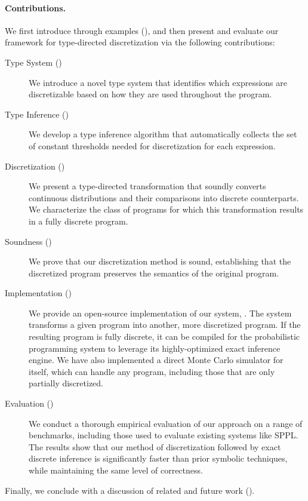 
\paragraph{Contributions.}

We first introduce \Slice{} through examples (), and then present and evaluate our framework for type-directed discretization via the following contributions:

\begin{description}
    \item[Type System ()] We introduce a novel type system that identifies which expressions are discretizable based on how they are used throughout the program.

    \item[Type Inference ()] We develop a type inference algorithm that automatically collects the set of constant thresholds needed for discretization for each expression.

    \item[Discretization ()] We present a type-directed transformation that soundly converts continuous distributions and their comparisons into discrete counterparts. We characterize the class of programs for which this transformation results in a fully discrete program.

    \item[Soundness ()] We prove that our discretization method is sound, establishing that the discretized program preserves the semantics of the original program.

    \item[Implementation ()] We provide an open-source implementation of our system, \Slice{}. The system transforms a given \Slice{} program into another, more discretized \Slice{} program. If the resulting program is fully discrete, it can be compiled for the \Dice{} probabilistic programming system to leverage its highly-optimized exact inference engine. We have also implemented a direct Monte Carlo simulator for \Slice{} itself, which can handle any program, including those that are only partially discretized.

    \item[Evaluation ()] We conduct a thorough empirical evaluation of our approach on a range of benchmarks, including those used to evaluate existing systems like SPPL\@. The results show that our method of discretization followed by exact discrete inference is significantly faster than prior symbolic techniques, while maintaining the same level of correctness.
\end{description}

Finally, we conclude with a discussion of related and future work ().

